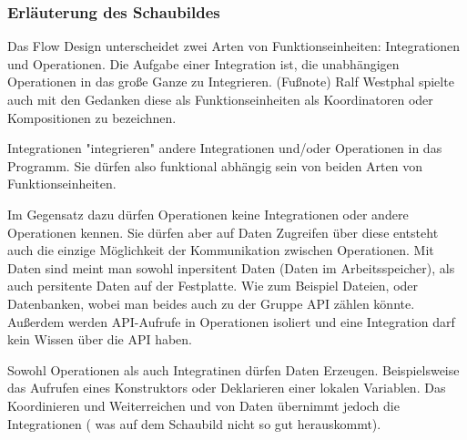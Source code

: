 \documentclass[11pt]{article}
\begin{document}
\subsubsection{Erläuterung des Schaubildes}
\label{sec:orgheadline24}
Das Flow Design unterscheidet zwei Arten von Funktionseinheiten: Integrationen und Operationen.
Die Aufgabe einer Integration ist, die unabhängigen Operationen in das große Ganze zu
Integrieren. 
(Fußnote) Ralf Westphal spielte auch mit den Gedanken diese als Funktionseinheiten als Koordinatoren oder
Kompositionen zu bezeichnen.

Integrationen "integrieren" andere Integrationen und/oder Operationen in das Programm. Sie dürfen also funktional abhängig sein
von beiden Arten von Funktionseinheiten.

Im Gegensatz dazu dürfen Operationen keine Integrationen oder andere Operationen kennen. 
Sie dürfen aber auf Daten Zugreifen über diese entsteht auch die einzige Möglichkeit der Kommunikation zwischen Operationen.
Mit Daten sind meint man sowohl inpersitent Daten (Daten im Arbeitsspeicher), als auch persitente Daten auf der Festplatte.
Wie zum Beispiel Dateien, oder Datenbanken, wobei man beides auch zu der Gruppe API zählen könnte. 
Außerdem werden API-Aufrufe in Operationen isoliert und eine Integration darf kein Wissen über die API haben.

Sowohl Operationen als auch Integratinen dürfen Daten Erzeugen.
Beispielsweise das Aufrufen eines Konstruktors oder Deklarieren einer lokalen Variablen.
Das Koordinieren und Weiterreichen und von Daten übernimmt jedoch die Integrationen ( was auf dem Schaubild nicht so
gut herauskommt).
\end{document}
